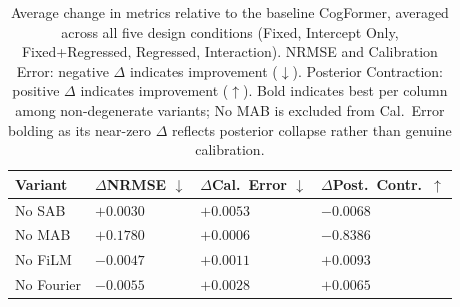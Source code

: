 \begin{table}[t]
\centering
\caption{Average change in metrics relative to the baseline CogFormer, averaged
across all five design conditions (Fixed, Intercept Only, Fixed+Regressed, Regressed,
Interaction). NRMSE and Calibration Error: negative $\Delta$ indicates improvement
($\downarrow$). Posterior Contraction: positive $\Delta$ indicates improvement
($\uparrow$). Bold indicates best per column among non-degenerate variants;
No MAB is excluded from Cal.\ Error bolding as its near-zero $\Delta$ reflects
posterior collapse rather than genuine calibration.}
\label{tab:component_ablation_avg_delta}
\begin{tabularx}{\textwidth}{>{\raggedright\arraybackslash}X >{\centering\arraybackslash}X >{\centering\arraybackslash}X >{\centering\arraybackslash}X}
\toprule
Variant & $\Delta$NRMSE $\downarrow$ & $\Delta$Cal.\ Error $\downarrow$ & $\Delta$Post.\ Contr.\ $\uparrow$ \\
\midrule
No SAB     & $+0.0030$ & $+0.0053$          & $-0.0068$ \\
No MAB     & $+0.1780$ & $+0.0006$          & $-0.8386$ \\
No FiLM    & $-0.0047$ & \textbf{$+0.0011$} & \textbf{$+0.0093$} \\
No Fourier & \textbf{$-0.0055$} & $+0.0028$ & $+0.0065$ \\
\bottomrule
\end{tabularx}
\end{table}
